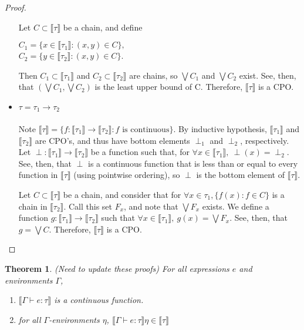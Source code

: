 \documentclass{westhesis}
\theoremstyle{plain}
\newtheorem{thm}{Theorem}
\theoremstyle{definition}
\begin{document}
\begin{proof}
\begin{itemize}
Let $C \subset \llbracket \tau \rrbracket$ be a
chain, and define
\begin{center}
$C_1 = \{x \in \llbracket \tau_1 \rrbracket : (x,y) \in C\},$ \\
$C_2 = \{ y \in \llbracket \tau_2 \rrbracket: (x,y) \in C\}$. \\ 
\end{center}
Then $C_1 \subset \llbracket \tau_1 \rrbracket$ and $C_2 \subset \llbracket \tau_2 \rrbracket$ are chains, so $\bigvee C_1$
and $\bigvee C_2$ exist. See, then, that $(\bigvee C_1, \bigvee C_2)$ is the least upper bound of C. Therefore, $\llbracket 
\tau \rrbracket$ is a CPO.
\item $\tau = \tau_1 \rightarrow \tau_2$ \\ \\
Note $\llbracket \tau \rrbracket = \{f : \llbracket \tau_1 \rrbracket \rightarrow \llbracket \tau_2 \rrbracket : f \text{ is continuous}\}
$. By inductive hypothesis, $\llbracket \tau_1 \rrbracket$ and $\llbracket \tau_2 \rrbracket$ are CPO's, and thus have bottom
elements $\perp_1$ and $\perp_2$, respectively. Let $\perp: \llbracket \tau_1 \rrbracket \rightarrow \llbracket \tau_2 
\rrbracket$ be a function such that, for $\forall x \in \llbracket \tau_1 \rrbracket, \ \perp(x) = \perp_2$. See, then, that 
$\perp$ is a continuous function that is less than or equal to every function in $\llbracket \tau \rrbracket$ (using pointwise
ordering), so $\perp$ is the bottom element of $\llbracket \tau \rrbracket$.  

Let $C \subset \llbracket \tau \rrbracket$ be a 
chain, and consider that for $\forall x \in \tau_1, \{f(x) : f \in C\}$ is a chain in $\llbracket \tau_2 \rrbracket$. Call this set $F_x$,
and note that $\bigvee F_x$ exists. We define a function $g: \llbracket \tau_1 \rrbracket \rightarrow \llbracket \tau_2 \rrbracket$ 
such that $\forall x \in \llbracket \tau_1 \rrbracket, \ g(x) = \bigvee F_x$. See, then, that $g = \bigvee C$. Therefore, $\llbracket
\tau \rrbracket$ is a CPO. \\
\end{itemize} 
\end{proof}
%
\begin{thm} 
(Need to update these proofs)
For all expressions $e$ and environments $\Gamma$,
\begin{enumerate}
\item $\llbracket \Gamma \vdash e : \tau \rrbracket$ is a continuous function. 
\item for all $\Gamma$-environments $\eta$, $\llbracket \Gamma \vdash e : \tau \rrbracket\eta \in \llbracket \tau \rrbracket$ 
\end{enumerate}
\end{thm}
\end{document}
